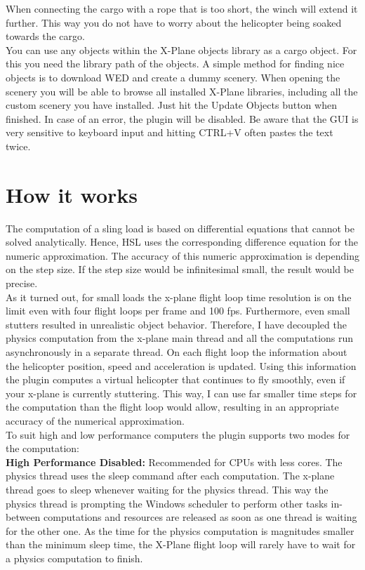 \documentclass[10pt,a4]{scrartcl}
\begin{document}
When connecting the cargo with a rope that is too short, the winch will extend it further. This way you do not have to worry about the helicopter being soaked towards the cargo.\\

You can use any objects within the X-Plane objects library as a cargo object. For this you need the library path of the objects. A simple method for finding nice objects is to download WED and create a dummy scenery. When opening the scenery you will be able to browse all installed X-Plane libraries, including all the custom scenery you have installed. Just hit the Update Objects button when finished. In case of an error, the plugin will be disabled. Be aware that the GUI is very sensitive to keyboard input and hitting CTRL+V often pastes the text twice.\\

\section{How it works}

The computation of a sling load is based on differential equations that cannot be solved analytically. Hence, HSL uses the corresponding difference equation for the numeric approximation. The accuracy of this numeric approximation is depending on the step size. If the step size would be infinitesimal small, the result would be precise.\\

As it turned out, for small loads the x-plane flight loop time resolution is on the limit even with four flight loops per frame and 100 fps. Furthermore, even small stutters resulted in unrealistic object behavior. Therefore, I have decoupled the physics computation from the x-plane main thread and all the computations run asynchronously in a separate thread. On each flight loop the information about the helicopter position, speed and acceleration is updated. Using this information the plugin computes a virtual helicopter that continues to fly smoothly, even if your x-plane is currently stuttering. This way, I can use far smaller time steps for the computation than the flight loop would allow, resulting in an appropriate accuracy of the numerical approximation.\\

To suit high and low performance computers the plugin supports two modes for the computation:\\

\textbf{High Performance Disabled:} Recommended for CPUs with less cores. The physics thread uses the sleep command after each computation. The x-plane thread goes to sleep whenever waiting for the physics thread. This way the physics thread is prompting the Windows scheduler to perform other tasks in-between computations and resources are released as soon as one thread is waiting for the other one. As the time for the physics computation is magnitudes smaller than the minimum sleep time, the X-Plane flight loop will rarely have to wait for a physics computation to finish.\\
\end{document}
